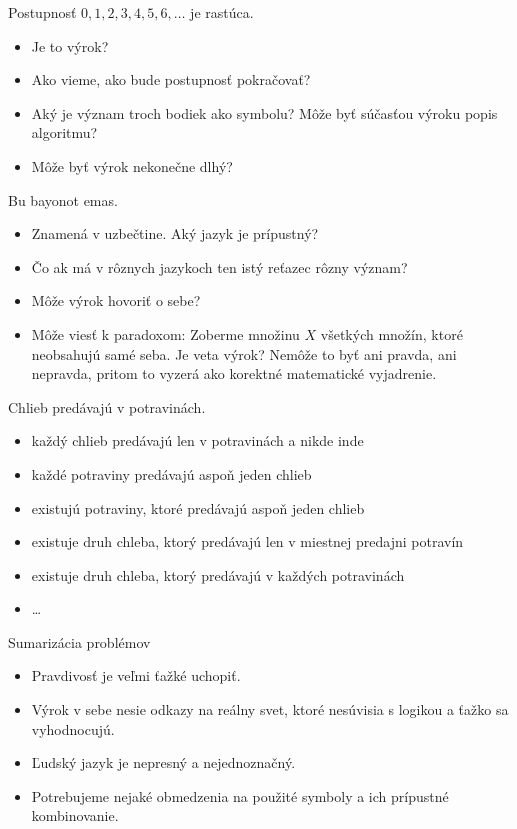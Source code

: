 \documentclass[12pt]{beamer}
\theoremstyle{definition}
\begin{document}
\begin{frame}
Postupnosť $0,1,2,3,4,5,6,\dots$ je rastúca.\\[4mm]
\begin{itemize}
\item Je to výrok?
\pause
\item Ako vieme, ako bude postupnosť pokračovať?
\pause
\item Aký je význam troch bodiek ako symbolu? Môže byť súčasťou výroku popis algoritmu?
\pause
\item Môže byť výrok nekonečne dlhý?
\end{itemize}
\end{frame}

\begin{frame}
Bu bayonot emas.\\[4mm]
\begin{itemize}
\item Znamená  v uzbečtine. Aký jazyk je prípustný?
\item Čo ak má v rôznych jazykoch ten istý reťazec rôzny význam?
\pause
\item Môže výrok hovoriť o sebe?
\item Môže viesť k paradoxom: Zoberme množinu $X$ všetkých množín, ktoré neobsahujú samé seba.
Je veta  výrok? Nemôže to byť ani pravda, ani nepravda,
pritom to vyzerá ako korektné matematické vyjadrenie.
\end{itemize}
\end{frame}

\begin{frame}
Chlieb predávajú v potravinách.\\[4mm]
\pause
\begin{itemize}
\item každý chlieb predávajú len v potravinách a nikde inde
\item každé potraviny predávajú aspoň jeden chlieb
\item existujú potraviny, ktoré predávajú aspoň jeden chlieb
\item existuje druh chleba, ktorý predávajú len v miestnej predajni potravín
\item existuje druh chleba, ktorý predávajú v každých potravinách
\item \dots
\end{itemize}
\end{frame}

\begin{frame}{Sumarizácia problémov}
\begin{itemize}
\item Pravdivosť je veľmi ťažké uchopiť.
\item Výrok v sebe nesie odkazy na reálny svet, ktoré nesúvisia s logikou a ťažko sa vyhodnocujú.
\item Ľudský jazyk je nepresný a nejednoznačný.
\item Potrebujeme nejaké obmedzenia na použité symboly a ich prípustné kombinovanie.
\end{itemize}
\end{frame}
\end{document}

